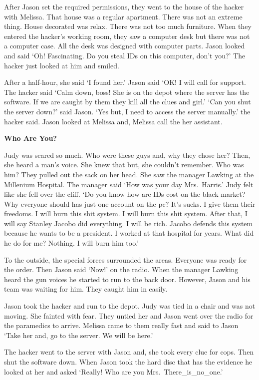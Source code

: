 \documentclass[]{book}
\begin{document}
After Jason set the required permissions, they went to the house of the hacker with Melissa. That house was a regular apartment. There was not an extreme thing. House decorated was relax. There was not too much furniture. When they entered the hacker's working room, they saw a computer desk but there was not a computer case. All the desk was designed with computer parts. Jason looked and said `Oh! Fascinating. Do you steal IDs on this computer, don't you?' The hacker just looked at him and smiled.

After a half-hour, she said `I found her.' Jason said `OK! I will call for support. The hacker said `Calm down, boss! She is on the depot where the server has the software. If we are caught by them they kill all the clues and girl.' `Can you shut the server down?' said Jason. `Yes but, I need to access the server manually.' the hacker said. Jason looked at Melissa and, Melissa call the her assistant.

\textbf{Who Are You?}

Judy was scared so much. Who were these guys and, why they chose her? Then, she heard a man's voice. She knew that but, she couldn't remember. Who was him? They pulled out the sack on her head. She saw the manager Lawking at the Millenium Hospital. The manager said `How was your day Mrs.~Harris.' Judy felt like she fell over the cliff. `Do you know how are IDs cost on the black market? Why everyone should has just one account on the pc? It's sucks. I give them their freedoms. I will burn this shit system. I will burn this shit system. After that, I will say Stanley Jacobo did everything. I will be rich. Jacobo defends this system because he wants to be a president. I worked at that hospital for years. What did he do for me? Nothing. I will burn him too.'

To the outside, the special forces surrounded the areas. Everyone was ready for the order. Then Jason said `Now!' on the radio. When the manager Lawking heard the gun voices he started to run to the back door. However, Jason and his team was waiting for him. They caught him in easily.

Jason took the hacker and run to the depot. Judy was tied in a chair and was not moving. She fainted with fear. They untied her and Jason went over the radio for the paramedics to arrive. Melissa came to them really fast and said to Jason `Take her and, go to the server. We will be here.'

The hacker went to the server with Jason and, she took every clue for cops. Then shut the software down. When Jason took the hard disc that has the evidence he looked at her and asked `Really! Who are you Mrs.~There\_is\_no\_one.'
\end{document}
